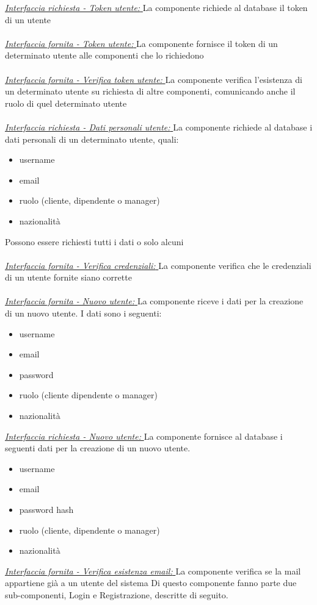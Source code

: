 \documentclass{report}
\begin{document}
\uline{\textit{Interfaccia richiesta - Token utente: }}La componente richiede al database il token di un utente
\\ \\ \uline{\textit{Interfaccia fornita - Token utente: }}La componente fornisce il token di un determinato utente alle componenti che lo richiedono
\\ \\ \uline{\textit{Interfaccia fornita - Verifica token utente: }}La componente verifica l'esistenza di un determinato utente su richiesta di altre componenti, comunicando anche il ruolo di quel determinato utente
\\ \\ \uline{\textit{Interfaccia richiesta - Dati personali utente: }} La componente richiede al database i dati personali di un determinato utente, quali:
\begin{itemize}
	\item username
	\item email
	\item ruolo (cliente, dipendente o manager)
	\item nazionalità
\end{itemize}  
Possono essere richiesti tutti i dati o solo alcuni
\\ \\ \uline{\textit{Interfaccia fornita - Verifica credenziali: }}La componente verifica che le credenziali di un utente fornite siano corrette 
\\ \\ \uline{\textit{Interfaccia fornita - Nuovo utente: }}La componente riceve i dati per la creazione di un nuovo utente. I dati sono i seguenti:
\begin{itemize}
	\item username
	\item email
	\item password
	\item ruolo (cliente dipendente o manager)
	\item nazionalità
\end{itemize}
\uline{\textit{Interfaccia richiesta - Nuovo utente: }}La componente fornisce al database i seguenti dati per la creazione di un nuovo utente.
\begin{itemize}
	\item username
	\item email
	\item password hash
	\item ruolo (cliente, dipendente o manager)
	\item nazionalità
\end{itemize}
\uline{\textit{Interfaccia fornita - Verifica esistenza email: }} La componente verifica se la mail appartiene già a un utente del sistema
Di questo componente fanno parte due sub-componenti, Login e Registrazione, descritte di seguito.
\end{document}

